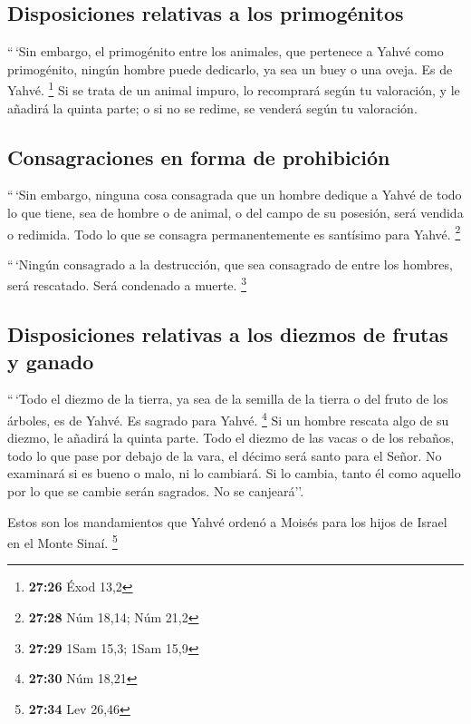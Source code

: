 \hypertarget{disposiciones-relativas-a-los-primoguxe9nitos}{%
\subsection{Disposiciones relativas a los
primogénitos}\label{disposiciones-relativas-a-los-primoguxe9nitos}}

 ``\,`Sin embargo, el primogénito entre los animales, que
pertenece a Yahvé como primogénito, ningún hombre puede dedicarlo, ya
sea un buey o una oveja. Es de Yahvé. \footnote{\textbf{27:26} Éxod 13,2}
 Si se trata de un animal impuro, lo recomprará según tu
valoración, y le añadirá la quinta parte; o si no se redime, se venderá
según tu valoración.

\hypertarget{consagraciones-en-forma-de-prohibiciuxf3n}{%
\subsection{Consagraciones en forma de
prohibición}\label{consagraciones-en-forma-de-prohibiciuxf3n}}

 ``\,`Sin embargo, ninguna cosa consagrada que un hombre
dedique a Yahvé de todo lo que tiene, sea de hombre o de animal, o del
campo de su posesión, será vendida o redimida. Todo lo que se consagra
permanentemente es santísimo para Yahvé. \footnote{\textbf{27:28} Núm
  18,14; Núm 21,2}

 ``\,`Ningún consagrado a la destrucción, que sea
consagrado de entre los hombres, será rescatado. Será condenado a
muerte. \footnote{\textbf{27:29} 1Sam 15,3; 1Sam 15,9}

\hypertarget{disposiciones-relativas-a-los-diezmos-de-frutas-y-ganado}{%
\subsection{Disposiciones relativas a los diezmos de frutas y
ganado}\label{disposiciones-relativas-a-los-diezmos-de-frutas-y-ganado}}

 ``\,`Todo el diezmo de la tierra, ya sea de la semilla
de la tierra o del fruto de los árboles, es de Yahvé. Es sagrado para
Yahvé. \footnote{\textbf{27:30} Núm 18,21}  Si un hombre
rescata algo de su diezmo, le añadirá la quinta parte. 
Todo el diezmo de las vacas o de los rebaños, todo lo que pase por
debajo de la vara, el décimo será santo para el Señor. 
No examinará si es bueno o malo, ni lo cambiará. Si lo cambia, tanto él
como aquello por lo que se cambie serán sagrados. No se canjeará''.

 Estos son los mandamientos que Yahvé ordenó a Moisés
para los hijos de Israel en el Monte Sinaí. \footnote{\textbf{27:34} Lev
  26,46}

